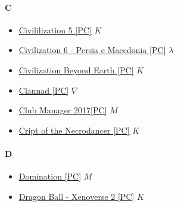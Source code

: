 		\paragraph{C} \hypertarget{GC}{}
			\begin{itemize}
				
				\item \href{https://mega.nz/#!mhkjFSbD!O7I0B6QT3etatLBYdiSwF7LAcWwOLMp4CEzjJiU7esY} {Civililization 5 [PC]} $K$ \\ 
				\item \href{https://mega.nz/#!JvhC2LZY!dqx4g2RbDdfLY6wK-cxueXG8wbRxzgT21xQF36xo9Fw} {Civilization 6 - Persia e Macedonia [PC]} $\lambda$ \\ 
				\item \href{https://mega.nz/#!moFTFTJC!t21HpcGlcqxYeVVfmKcZOB_bmpuOqV-miMXqq4hzjt8} {Civilization Beyond Earth [PC]} $K$ \\ 
				\item \href{https://mega.nz/#!mCQxwJxD!8NxCCo7Vq7o-5SOPVbEEXR4lUsKrji7IY3yZ4jAxJWk} {Clannad [PC]} $\nabla$ \\ 
				\item \href{https://mega.nz/#!ZjBzDSzY!-q2H-fxcyBKmgwf2j8MemPn3N1Ktwf6WlqzfjDDTYf0} {Club Manager 2017[PC]} $M$ \\ 
				\item \href{https://mega.nz/#!srYWybQa!5yib4gBlFsQAoJi1e9A8tpUZw8GPJy8vouItnxW1_Gs} {Cript of the Necrodancer [PC]} $K$ \\ 
				
				
			\end{itemize}
		
		\paragraph{D} \hypertarget{GD}{}
			\begin{itemize}
				\item \href{https://mega.nz/#!pyYyWboa!oUWLjT6k-iyGVw7cAoLvjWpwFcM67ybFHdnYM7tjHao} {Domination [PC]} $M$ \\
				\item \href{https://mega.nz/#!7lETxaCb!W4HupyjlJR3Y8DDZT7AI2T62OcOogYVzH1-Ag2qSKvM} {Dragon Ball - Xenoverse 2 [PC]} $K$ \\ 
			
			
			
		\end{itemize}	
	
